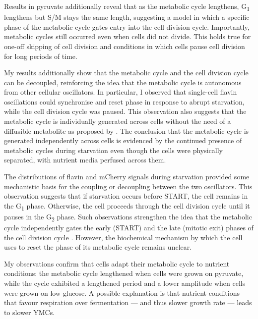 Results in pyruvate additionally reveal that as the metabolic cycle lengthens, G\textsubscript{1} lengthens but S/M stays the same length, suggesting a model in which a specific phase of the metabolic cycle gates entry into the cell division cycle.
Importantly, metabolic cycles still occurred even when cells did not divide.
This holds true for one-off skipping of cell division and conditions in which cells pause cell division for long periods of time.

My results additionally show that the metabolic cycle and the cell division cycle can be decoupled, reinforcing the idea that the metabolic cycle is autonomous from other cellular oscillators.
In particular, I observed that single-cell flavin oscillations could synchronise and reset phase in response to abrupt starvation, while the cell division cycle was paused.
This observation also suggests that the metabolic cycle is individually generated across cells without the need of a diffusible metabolite as proposed by \textcite{krishnaMinimalPushPull2018}.
The conclusion that the metabolic cycle is generated independently across cells is evidenced by the continued presence of metabolic cycles during starvation even though the cells were physically separated, with nutrient media perfused across them.

The distributions of flavin and mCherry signals during starvation provided some mechanistic basis for the coupling or decoupling between the two oscillators.
This observation suggests that if starvation occurs before START, the cell remains in the G\textsubscript{1} phase.
Otherwise, the cell proceeds through the cell division cycle until it pauses in the G\textsubscript{2} phase.
Such observations strengthen the idea that the metabolic cycle independently gates the early (START) and the late (mitotic exit) phases of the cell division cycle \parencite{ozsezenInferenceHighLevelInteraction2019}.
However, the biochemical mechanism by which the cell uses to reset the phase of its metabolic cycle remains unclear.

My observations confirm that cells adapt their metabolic cycle to nutrient conditions:
the metabolic cycle lengthened when cells were grown on pyruvate, while the cycle exhibited a lengthened period and a lower amplitude when cells were grown on low glucose.
A possible explanation is that nutrient conditions that favour respiration over fermentation --- and thus slower growth rate --- leads to slower YMCs.

